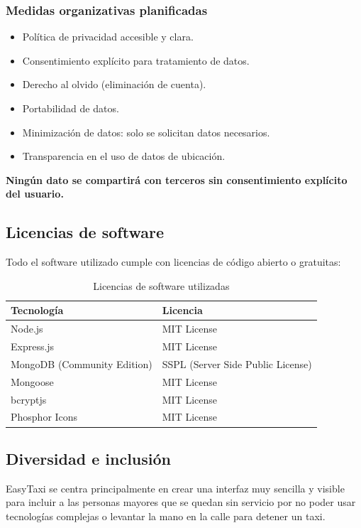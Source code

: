 \documentclass[12pt,a4paper]{article}
\begin{document}
\subsubsection{Medidas organizativas planificadas}

\begin{itemize}
    \item Política de privacidad accesible y clara.
    \item Consentimiento explícito para tratamiento de datos.
    \item Derecho al olvido (eliminación de cuenta).
    \item Portabilidad de datos.
    \item Minimización de datos: solo se solicitan datos necesarios.
    \item Transparencia en el uso de datos de ubicación.
\end{itemize}

\textbf{Ningún dato se compartirá con terceros sin consentimiento explícito del usuario.}

\subsection{Licencias de software}

Todo el software utilizado cumple con licencias de código abierto o gratuitas:

\begin{table}[h]
\centering
\begin{tabular}{|l|l|}
\hline
\textbf{Tecnología} & \textbf{Licencia} \\
\hline
Node.js & MIT License \\
Express.js & MIT License \\
MongoDB (Community Edition) & SSPL (Server Side Public License) \\
Mongoose & MIT License \\
bcryptjs & MIT License \\
Phosphor Icons & MIT License \\
\hline
\end{tabular}
\caption{Licencias de software utilizadas}
\end{table}

\subsection{Diversidad e inclusión}

EasyTaxi se centra principalmente en crear una interfaz muy sencilla y visible para incluir a las personas mayores que se quedan sin servicio por no poder usar tecnologías complejas o levantar la mano en la calle para detener un taxi.
\end{document}
